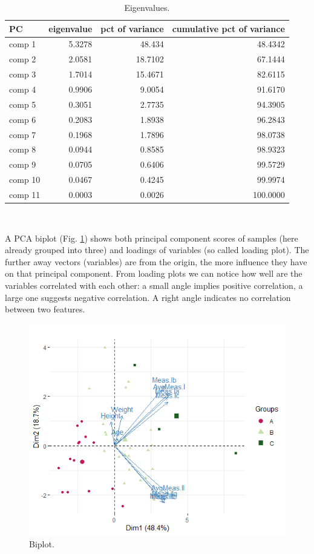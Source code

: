 \documentclass[12pt,a4paper,notitlepage]{report}
\begin{document}
\begin{table}[H]
\centering
	\begin{tabular}{lrrr}
	\hline PC	&	eigenvalue	&	pct of variance	&	cumulative pct of variance  \\
	\hline
	comp 1		&	5.3278		&	48.434			&	48.4342\\
	comp 2		&	2.0581		&	18.7102			&	67.1444\\
	comp 3		&	1.7014		&	15.4671			&	82.6115\\
	\hline
	comp 4		&	0.9906		&	9.0054			&	91.6170\\
	comp 5		&	0.3051		&	2.7735			&	94.3905\\
	comp 6		&	0.2083		&	1.8938			&	96.2843\\
	comp 7		&	0.1968		&	1.7896			&	98.0738\\
	comp 8		&	0.0944		&	0.8585			&	98.9323\\
	comp 9		&	0.0705		&	0.6406			&	99.5729\\
	comp 10		&	0.0467		&	0.4245			&	99.9974\\
	comp 11		&	0.0003		&	0.0026			&	100.0000\\
	\hline
	\end{tabular} \\ 
	\caption{Eigenvalues.}
	\label{tab:Eigenvalues}
\end{table}


A PCA biplot (Fig. \ref{fig:Fig_3.3}) shows both principal component scores of samples (here already grouped into three) and loadings of variables (so called loading plot). The further away vectors (variables) are from the origin, the more influence they have on that principal component.  From loading plots we can notice how well are the variables correlated with each other: a small angle implies positive correlation, a large one suggests negative correlation. A right angle indicates no correlation between two features.

\begin{figure}[H]
	\centering
	\includegraphics[scale=0.75]{./Figures/Fig_3.3}
	\caption{Biplot.}
	\label{fig:Fig_3.3}
\end{figure}	
\end{document}
